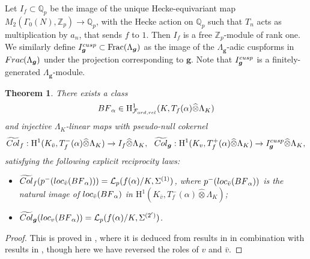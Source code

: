 \documentclass[a4paper,10pt]{amsart}
\numberwithin{equation}{section}
\numberwithin{equation}{section}
\theoremstyle{plain}
\newtheorem{thm}{Theorem}[subsection] %
\theoremstyle{definition}
\theoremstyle{definition}
\theoremstyle{plain}
\theoremstyle{plain}
\theoremstyle{plain}
\theoremstyle{plain}
\newcommand{\Frac}{\operatorname{Frac}}
\newcommand{\Z}{\mathbb{Z}}
\newcommand{\Q}{\mathbb{Q}}
\newcommand{\Qp}{\mathbb{Q}_{p}}
\newcommand{\bg}{\boldsymbol{g}}
\newcommand{\Lcal}{\mathcal{L}}
\newcommand{\Fcal}{\mathcal{F}}
\newcommand{\rH}{\mathrm{H}}
\begin{document}

Let $I_f \subset \Qp$ be the image of the unique Hecke-equivariant map $M_2(\Gamma_0(N),\Z_p)\rightarrow \Q_p$, with the Hecke action on $\Q_p$ 
such that $T_n$ acts as multiplication by $a_n$, that sends $f$ to $1$. Then $I_f$ is a free $\Z_p$-module of rank one. 
We similarly define $I_{\bg}^{\rm cusp} \subset \Frac(\Lambda_{\bg})$ as  the image of the $\Lambda_{\boldsymbol{g}}$-adic cuspforms in ${\rm Frac}(\Lambda_{\boldsymbol{g}})$ under the projection corresponding to ${\boldsymbol{g}}$. Note that $I_{\bg}^{\rm cusp}$ is a finitely-generated $\Lambda_{\bg}$-module. 


\begin{thm}%
\label{thm:KLZ}
There exists a class
\[
{BF}_\alpha\in\rH^1_{\Fcal_{\rm ord,\rm rel}}(K,T_f(\alpha)\widehat\otimes\Lambda_K)
\]
and injective $\Lambda_K$-linear maps with pseudo-null cokernel
\begin{align*}
\widetilde{\rm Col}_{f}:\rH^1(K_{\bar{v}},T_f^-(\alpha)\widehat\otimes\Lambda_K) \to I_f\widehat\otimes\Lambda_K, \ \ 
\widetilde{\rm Col}_{\boldsymbol{g}}:\rH^1(K_{v},T_f^+(\alpha)\widehat\otimes\Lambda_K) \to I_{\bg}^{\rm cusp}\widehat\otimes\Lambda_K,
\end{align*}
satisfying the following explicit reciprocity laws:
\begin{itemize}
\item[(a)] 
$\widetilde{\rm Col}_f(p^-({\rm loc}_{\bar v}({BF}_\alpha)))=\Lcal_p(f(\alpha)/K,\Sigma^{(1)})$, where $p^-({\rm loc}_{\bar{v}}({BF}_\alpha))$ is the natural image of ${\rm loc}_{\bar{v}}({BF}_\alpha)$ in $\rH^1(K_{\bar{v}},T_f^-(\alpha)\widehat\otimes\Lambda_K)$;
\item[(b)] $\widetilde{\rm Col}_{\boldsymbol{g}}({\rm loc}_{v}({BF}_\alpha))=\Lcal_p(f(\alpha)/K,\Sigma^{(2')})$.
\end{itemize}
\end{thm}

\begin{proof} This is proved in \cite[\S5]{BST}, where it is deduced from results in \cite{explicit} 
in combination with results in \cite{Betina-Dimitrov-Pozzi}, though here we have reversed the roles of $v$ and $\bar v$. 
\end{proof}
\end{document}
